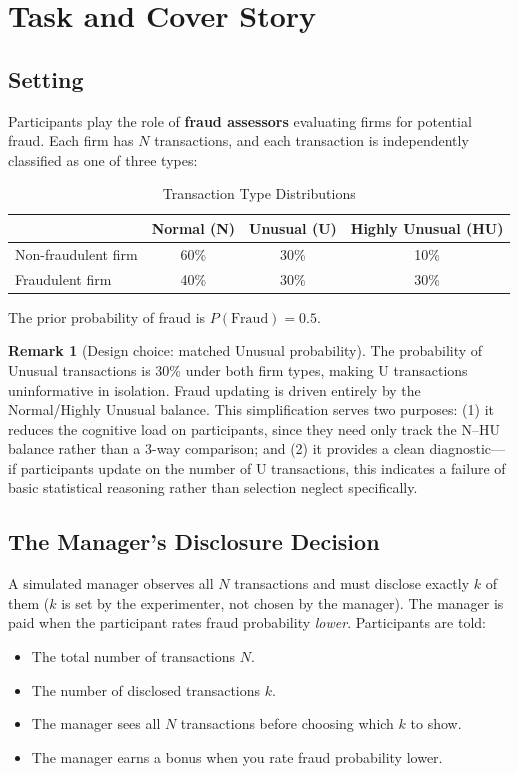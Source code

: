 \documentclass[12pt]{article}
\theoremstyle{definition}
\newtheorem{remark}{Remark}
\begin{document}
\section{Task and Cover Story}
\label{sec:task}

\subsection{Setting}

Participants play the role of \textbf{fraud assessors} evaluating firms for potential fraud. Each firm has $N$ transactions, and each transaction is independently classified as one of three types:

\begin{table}[h!]
\centering
\caption{Transaction Type Distributions}
\label{tab:distributions}
\begin{tabular}{lccc}
\toprule
& Normal (N) & Unusual (U) & Highly Unusual (HU) \\
\midrule
Non-fraudulent firm & 60\% & 30\% & 10\% \\
Fraudulent firm & 40\% & 30\% & 30\% \\
\bottomrule
\end{tabular}
\end{table}

The prior probability of fraud is $P(\text{Fraud}) = 0.5$.

\begin{remark}[Design choice: matched Unusual probability]
The probability of Unusual transactions is 30\% under both firm types, making U transactions uninformative in isolation. Fraud updating is driven entirely by the Normal/Highly Unusual balance. This simplification serves two purposes: (1) it reduces the cognitive load on participants, since they need only track the N--HU balance rather than a 3-way comparison; and (2) it provides a clean diagnostic---if participants update on the number of U transactions, this indicates a failure of basic statistical reasoning rather than selection neglect specifically.
\end{remark}

\subsection{The Manager's Disclosure Decision}

A simulated manager observes all $N$ transactions and must disclose exactly $k$ of them ($k$ is set by the experimenter, not chosen by the manager). The manager is paid when the participant rates fraud probability \emph{lower}. Participants are told:
\begin{itemize}[nosep]
\item The total number of transactions $N$.
\item The number of disclosed transactions $k$.
\item The manager sees all $N$ transactions before choosing which $k$ to show.
\item The manager earns a bonus when you rate fraud probability lower.
\end{itemize}
\end{document}
